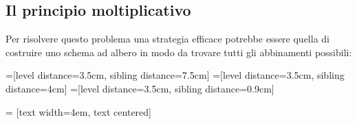 \documentclass{article}     %
\begin{document}
        \subsection{Il principio moltiplicativo}
            \begin{ex}
            
            Per risolvere questo problema una strategia efficace potrebbe essere quella di costruire uno schema ad albero in modo da trovare tutti gli abbinamenti possibili:
            
            =[level distance=3.5cm, sibling distance=7.5cm]
            =[level distance=3.5cm, sibling distance=4cm]
            =[level distance=3.5cm, sibling distance=0.9cm]
            
             = [text width=4em, text centered]
            

\end{ex}
\end{document}
